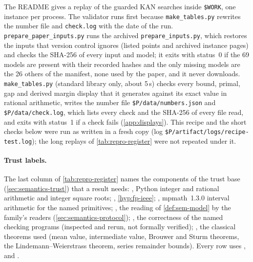 The README gives a replay of the guarded KAN searches inside \nolinkurl{$WORK}, one instance per process.
The validator runs first because \nolinkurl{make_tables.py} rewrites the number file and \nolinkurl{check.log} with the date of the run.
\nolinkurl{prepare_paper_inputs.py} runs the archived \nolinkurl{prepare_inputs.py}, which restores the inputs that version control ignores (listed points and archived instance pages) and checks the SHA-256 of every input and model; it exits with status~0 if the 69 models are present with their recorded hashes and the only missing models are the 26 others of the manifest, none used by the paper, and it never downloads.
\nolinkurl{make_tables.py} (standard library only, about 5\,s) checks every bound, primal, gap and derived margin display that it generates against its exact value in rational arithmetic, writes the number file \nolinkurl{$P/data/numbers.json} and \nolinkurl{$P/data/check.log}, which lists every check and the SHA-256 of every file read, and exits with status~1 if a check fails (\cref{app:displays}).
This recipe and the short checks below were run as written in a fresh copy (log \nolinkurl{$P/artifact/logs/recipe-test.log}); the long replays of \cref{tab:repro-register} were not repeated under it.

\paragraph{Trust labels.}
The last column of \cref{tab:repro-register} names the components of the trust base (\cref{sec:semantics-trust}) that a result needs:
, Python integer and rational arithmetic and integer square roots;
, \cref{hyp:fp-ieee};
, mpmath~1.3.0 interval arithmetic for the named primitives;
, the reading of \cref{def:sem-model} by the family's readers (\cref{sec:semantics-protocol});
, the correctness of the named checking programs (inspected and rerun, not formally verified);
, the classical theorems used (mean value, intermediate value, Brouwer and Sturm theorems, the Lindemann--Weierstrass theorem, series remainder bounds).
Every row uses ,  and .


